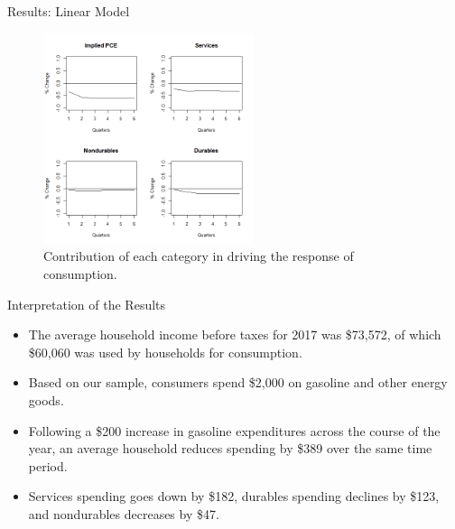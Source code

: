 \documentclass[
  10pt,
  ignorenonframetext,
]{beamer}
\begin{document}
\begin{frame}{Results: Linear Model}
\protect\hypertarget{results-linear-model-1}{}

\begin{figure}
\centering
\includegraphics[width=0.55\textwidth,height=\textheight]{Contribution.png}
\caption{Contribution of each category in driving the response of
consumption.}
\end{figure}

\end{frame}

\begin{frame}{Interpretation of the Results}
\protect\hypertarget{interpretation-of-the-results}{}

\begin{itemize}
\item
  The average household income before taxes for 2017 was \$73,572, of
  which \$60,060 was used by households for consumption.
\item
  Based on our sample, consumers spend \$2,000 on gasoline and other
  energy goods.
\item
  Following a \$200 increase in gasoline expenditures across the course
  of the year, an average household reduces spending by \$389 over the
  same time period.
\item
  Services spending goes down by \$182, durables spending declines by
  \$123, and nondurables decreases by \$47.
\end{itemize}

\end{frame}
\end{document}
